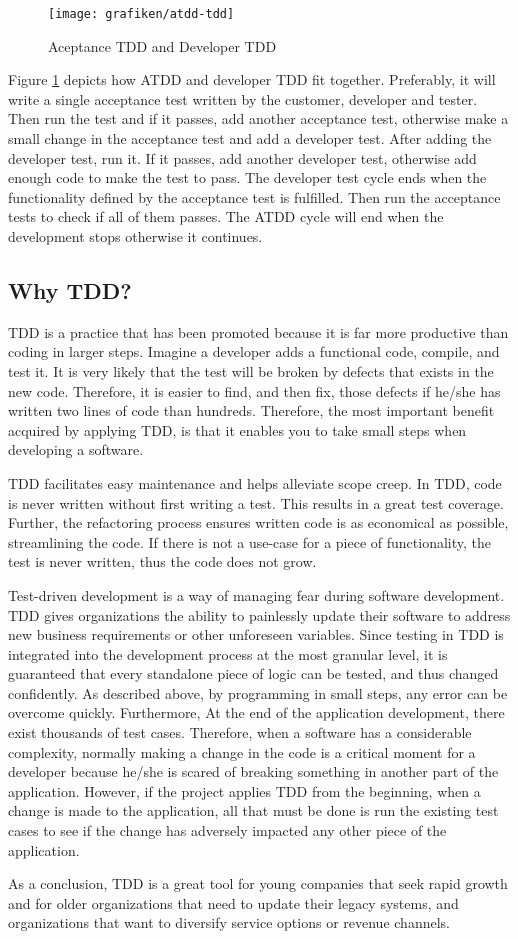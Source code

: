 \begin{figure}[H]
	\centering
    \texttt{[image: grafiken/atdd-tdd]}
    \caption{Aceptance TDD and Developer TDD\cite{Ambler2013}}
    \label{fig:atdd-tdd}
\end{figure}  

Figure \ref{fig:atdd-tdd} depicts how ATDD and developer TDD fit together. Preferably, it will write a single acceptance test written by the customer, developer and tester. Then run the test and if it passes, add another acceptance test, otherwise make a small change in the acceptance test and add a developer test. After adding the developer test, run it. If it passes, add another developer test, otherwise add enough code to make the test to pass. The developer test cycle ends when the functionality defined by the acceptance test is fulfilled. Then run the acceptance tests to check if all of them passes. The ATDD cycle will end when the development stops otherwise it continues.

\subsection{Why TDD?}
TDD is a practice that has been promoted because it is far more productive than coding in larger steps\citep{Ambler2013}. Imagine a developer adds a functional code, compile, and test it. It is very likely that the test will be broken by defects that exists in the new code. Therefore, it is easier to find, and then fix, those defects if he/she has written two lines of code than hundreds. Therefore, the most important benefit acquired by applying TDD, is that it enables you to take small steps when developing a software.

TDD facilitates easy maintenance and helps alleviate scope creep. In TDD, code is never written without first writing a test. This results in a great test coverage. Further, the refactoring process ensures written code is as economical as possible, streamlining the code. If there is not a use-case for a piece of functionality, the test is never written, thus the code does not grow.

Test-driven development is a way of managing fear during software development\cite{Beck2003}. TDD gives organizations the ability to painlessly update their software to address new business requirements or other unforeseen variables. Since testing in TDD is integrated into the development process at the most granular level, it is guaranteed that every standalone piece of logic can be tested, and thus changed confidently. As described above, by programming in small steps, any error can be overcome quickly. Furthermore, At the end of the application development, there exist thousands of test cases. Therefore, when a software has a considerable complexity, normally making a change in the code is a critical moment for a developer because he/she is scared of breaking something in another part of the application. However, if the project applies TDD from the beginning, when a change is made to the application, all that must be done is run the existing test cases to see if the change has adversely impacted any other piece of the application.

As a conclusion, TDD is a great tool for young companies that seek rapid growth and for older organizations that need to update their legacy systems, and organizations that want to diversify service options or revenue channels.

